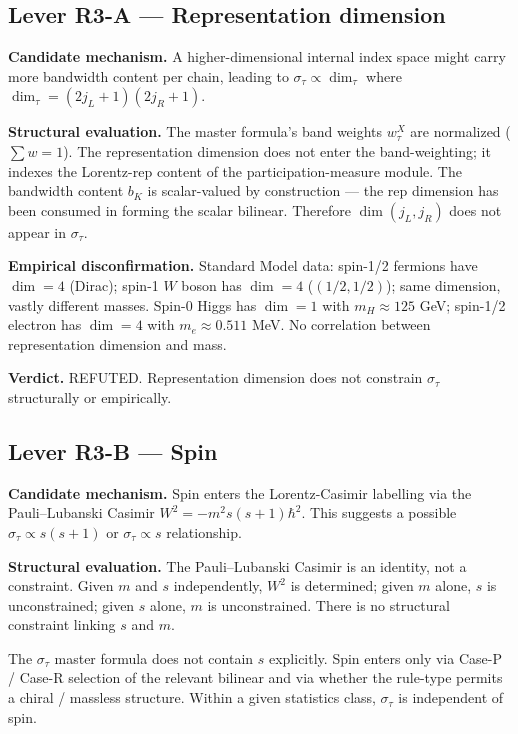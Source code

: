\documentclass[11pt,a4paper]{article}
\begin{document}
\subsection{Lever R3-A --- Representation dimension}

\textbf{Candidate mechanism.} A higher-dimensional internal index space might carry more bandwidth content per chain, leading to $\sigma_\tau \propto \dim_\tau$ where $\dim_\tau = (2j_L + 1)(2j_R + 1)$.

\textbf{Structural evaluation.} The master formula's band weights $w_\tau^X$ are normalized ($\sum w = 1$). The representation dimension does not enter the band-weighting; it indexes the Lorentz-rep content of the participation-measure module. The bandwidth content $b_K$ is scalar-valued by construction --- the rep dimension has been consumed in forming the scalar bilinear. Therefore $\dim(j_L, j_R)$ does not appear in $\sigma_\tau$.

\textbf{Empirical disconfirmation.} Standard Model data: spin-1/2 fermions have $\dim = 4$ (Dirac); spin-1 $W$ boson has $\dim = 4$ ($(1/2,1/2)$); same dimension, vastly different masses. Spin-0 Higgs has $\dim = 1$ with $m_H \approx 125$ GeV; spin-1/2 electron has $\dim = 4$ with $m_e \approx 0.511$ MeV. No correlation between representation dimension and mass.

\textbf{Verdict.} REFUTED. Representation dimension does not constrain $\sigma_\tau$ structurally or empirically.

\subsection{Lever R3-B --- Spin}

\textbf{Candidate mechanism.} Spin enters the Lorentz-Casimir labelling via the Pauli--Lubanski Casimir $W^2 = -m^2 s(s+1)\hbar^2$. This suggests a possible $\sigma_\tau \propto s(s+1)$ or $\sigma_\tau \propto s$ relationship.

\textbf{Structural evaluation.} The Pauli--Lubanski Casimir is an identity, not a constraint. Given $m$ and $s$ independently, $W^2$ is determined; given $m$ alone, $s$ is unconstrained; given $s$ alone, $m$ is unconstrained. There is no structural constraint linking $s$ and $m$.

The $\sigma_\tau$ master formula does not contain $s$ explicitly. Spin enters only via Case-P / Case-R selection of the relevant bilinear and via whether the rule-type permits a chiral / massless structure. Within a given statistics class, $\sigma_\tau$ is independent of spin.
\end{document}
